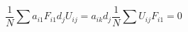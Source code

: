 \begin{equation}
	\frac{1}{N}\sum a_{i1}F_{i1}d_{j}U_{ij}=a_{ik}d_{j} \frac{1}{N}\sum U_{ij}F_{i1} =0
\end{equation}
